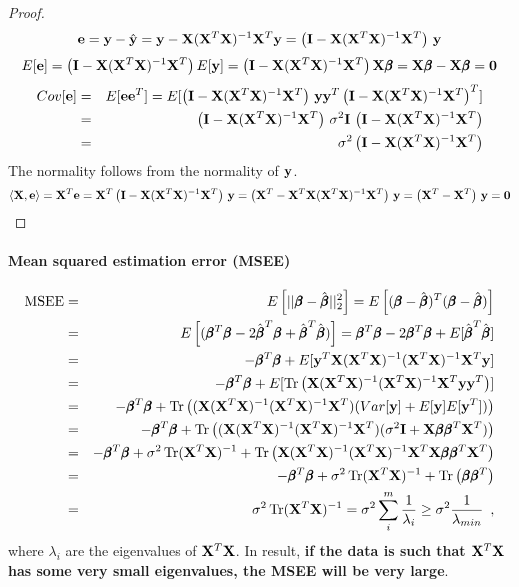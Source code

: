 \begin{proof}
\begin{equation*}
\be = \by - \hat{\by} =  \by - \bX (\bX^T \bX)^{-1} \bX^T \by = \left(\bI - \bX (\bX^T \bX)^{-1} \bX^T \right) \, \by
\end{equation*}
\begin{equation*}
E[\be] = \left(\bI - \bX (\bX^T \bX)^{-1} \bX^T \right) E[\by] = \left(\bI - \bX (\bX^T \bX)^{-1} \bX^T \right) \bX \pb = \bX \pb - \bX \pb = \vc{0}
\end{equation*}
\begin{eqnarray*}
Cov[\be] & = & E[\be \be^T] = E[\left(\bI - \bX (\bX^T \bX)^{-1} \bX^T \right) \, \by  
\by^T \left(\bI - \bX (\bX^T \bX)^{-1} \bX^T \right)^T] \\
& = & \left(\bI - \bX (\bX^T \bX)^{-1} \bX^T \right) \, \sigma^2 \bI \, \left(\bI - \bX (\bX^T \bX)^{-1} \bX^T \right) \\
& = & \sigma^2 \left(\bI - \bX (\bX^T \bX)^{-1} \bX^T\right)
\end{eqnarray*}
The normality follows from the normality of $\by$.
\begin{equation*}
\langle \bX, \be \rangle = \bX^T \be = \bX^T \left(\bI - \bX (\bX^T \bX)^{-1} \bX^T \right) \, \by = \left(\bX^T - \bX^T \bX (\bX^T \bX)^{-1} \bX^T \right) \, \by = \left(\bX^T - \bX^T \right) \, \by = \vc{0}
\end{equation*}
\end{proof}

\paragraph{Mean squared estimation error (MSEE)}
\begin{eqnarray}\label{eq:MSEE}
\text{MSEE} & = & E \left[ ||\pb - \hat{\pb}||_2^2 \right]
 = E \left[ (\pb - \hat{\pb})^T (\pb - \hat{\pb}) \right] \nn
 & = &
 E \left[ (\pb^T \pb - 2 \hat{\pb}^T \pb + \hat{\pb}^T \hat{\pb}) \right] 
 = \pb^T \pb - 2 \pb^T \pb + E[\hat{\pb}^T \hat{\pb}] \nn
 & = & - \pb^T \pb + E[ \by^T \bX (\bX^T \bX)^{-1} (\bX^T \bX)^{-1} \bX^T \by ] \nn
 & = & - \pb^T \pb + E[ \Tr \left( \bX (\bX^T \bX)^{-1} (\bX^T \bX)^{-1} \bX^T \by  \by^T \right) ] \nn
 & = & - \pb^T \pb + \Tr \left( (\bX (\bX^T \bX)^{-1} (\bX^T \bX)^{-1} \bX^T )(Var[ \by ] + E[\by]E[\by^T]) \right) \nn
 & = & - \pb^T \pb + \Tr \left( (\bX (\bX^T \bX)^{-1} (\bX^T \bX)^{-1} \bX^T )(\sigma^2 \bI + \bX \pb \pb^T \bX^T) \right) \nn
  & = & - \pb^T \pb + \sigma^2 \Tr (\bX^T \bX)^{-1}
   + \Tr  \left( \bX (\bX^T \bX)^{-1} (\bX^T \bX)^{-1} \bX^T \bX \pb \pb^T \bX^T \right) \nn
  & = & - \pb^T \pb + \sigma^2 \Tr (\bX^T \bX)^{-1}
   + \Tr  \left( \pb \pb^T \right) \nn
  & = & \sigma^2 \Tr (\bX^T \bX)^{-1} = \sigma^2 \sum_i^m \frac{1}{\lambda_i} \geq  \sigma^2 \frac{1}{\lambda_{min}} \enspace,
 \end{eqnarray}
where $\lambda_i$ are the eigenvalues of $\bX^T \bX$.
In result, \textbf{if the data is such that $\bX^T \bX$ has some very small eigenvalues, the MSEE will be very large}.


